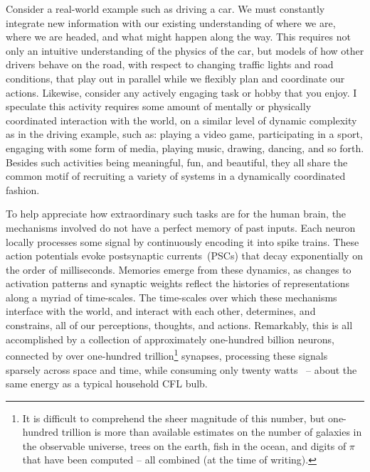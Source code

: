 Consider a real-world example such as driving a car. We must constantly integrate new information with our existing understanding of where we are, where we are headed, and what might happen along the way.
This requires not only an intuitive understanding of the physics of the car, but models of how other drivers behave on the road, with respect to changing traffic lights and road conditions, that play out in parallel while we flexibly plan and coordinate our actions.
Likewise, consider any actively engaging task or hobby that you enjoy.
I speculate this activity requires some amount of mentally or physically coordinated interaction with the world, on a similar level of dynamic complexity as in the driving example, such as: playing a video game, participating in a sport, engaging with some form of media, playing music, drawing, dancing, and so forth.
Besides such activities being meaningful, fun, and beautiful, they all share the common motif of recruiting a variety of systems in a dynamically coordinated fashion.

To help appreciate how extraordinary such tasks are for the human brain, the mechanisms involved do not have a perfect memory of past inputs.
Each neuron locally processes some signal by continuously encoding it into spike trains.
These action potentials evoke postsynaptic currents~(PSCs) that decay exponentially on the order of milliseconds.
Memories emerge from these dynamics, as changes to activation patterns and synaptic weights reflect the histories of representations along a myriad of time-scales.
The time-scales over which these mechanisms interface with the world, and interact with each other, determines, and constrains, all of our perceptions, thoughts, and actions.
Remarkably, this is all accomplished by a collection of approximately one-hundred billion neurons, connected by over one-hundred trillion\footnote{
It is difficult to comprehend the sheer magnitude of this number, but one-hundred trillion is more than available estimates on the number of galaxies in the observable universe, trees on the earth, fish in the ocean, and digits of $\pi$ that have been computed -- all combined (at the time of writing).
}
synapses, processing these signals sparsely across space and time, while consuming only twenty watts~\citep{koch2014} -- about the same energy as a typical household CFL bulb.

